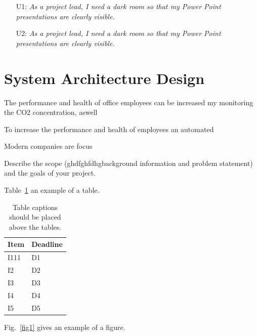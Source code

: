 \documentclass[runningheads]{llncs}
\begin{document}
\newpage


\begin{itemize}
    \item [U1:] \textit{As a project lead, I need a dark room so that my Power Point presentations are clearly visible.}
    \item [U2:]\label{test} \textit{As a project lead, I need a dark room so that my Power Point presentations are clearly visible.}
\end{itemize}

\section{System Architecture Design}












The performance and health of office employees can be increased my monitoring the CO2 concentration, aswell   

To increase the performance and health of employees an automated  



Modern companies are focus




Describe the scope (ghdfghfdhgbackground information and problem statement) and the goals of your project.

Table~\ref{tab1} an example of a table.

\begin{table}
\caption{Table captions should be placed above the
tables.}\label{tab1}
\begin{tabular}{|l|l|}
\hline
Item & Deadline \\
\hline
I111 & D1 \\
I2 & D2 \\
I3 & D3 \\
I4 & D4 \\
I5 & D5 \\
\hline
\end{tabular}
\end{table}

Fig.~\ref{fig1} gives an example of a figure.
\end{document}
